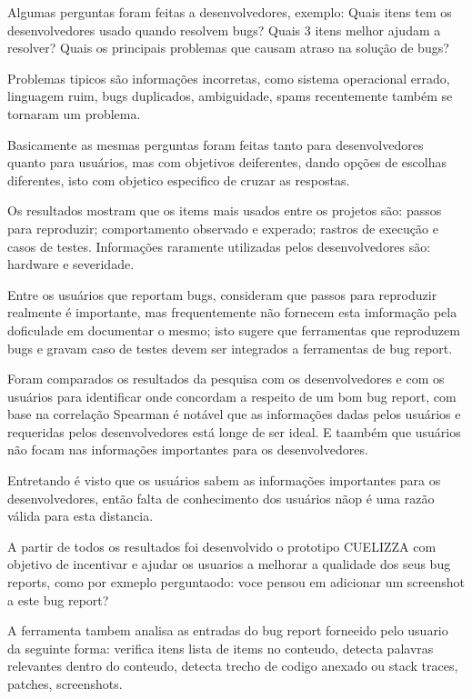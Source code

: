 \documentclass[12pt]{article}
\begin{document}
Algumas perguntas foram feitas a desenvolvedores, exemplo: Quais itens tem os desenvolvedores usado quando resolvem bugs? Quais 3 itens melhor ajudam a resolver? Quais os principais problemas que causam atraso na solução de bugs?

Problemas tipicos são informações incorretas, como sistema operacional errado, linguagem ruim, bugs duplicados, ambiguidade, spams recentemente também se tornaram um problema.

Basicamente as mesmas perguntas foram feitas tanto para desenvolvedores quanto para usuários, mas com objetivos deiferentes, dando opções de escolhas diferentes, isto com objetico especifico de cruzar as respostas.

Os resultados mostram que os items mais usados entre os projetos são: passos para reproduzir; comportamento observado e experado; rastros de execução e casos de testes. Informações raramente utilizadas pelos desenvolvedores são: hardware e severidade.

Entre os usuários que reportam bugs, consideram que passos para reproduzir realmente é importante, mas frequentemente não fornecem esta imformação pela doficulade em documentar o mesmo; isto sugere que ferramentas que reproduzem bugs e gravam caso de testes devem ser integrados a ferramentas de bug report.

Foram comparados os resultados da pesquisa com os desenvolvedores e com os usuários para identificar onde concordam a respeito de um bom bug report, com base na correlação Spearman é notável que as informações dadas pelos usuários e requeridas pelos desenvolvedores está longe de ser ideal. E taambém que usuários não focam nas informações importantes para os desenvolvedores.

Entretando é visto que os usuários sabem as informações importantes para os desenvolvedores, então falta de conhecimento dos usuários nãop é uma razão válida para esta distancia.

A partir de todos os resultados foi desenvolvido o prototipo CUELIZZA com objetivo de incentivar e ajudar os usuarios a melhorar a qualidade dos seus bug reports, como por exmeplo perguntaodo: voce pensou em adicionar um screenshot a este bug report?

A ferramenta tambem analisa as entradas do bug report forneeido pelo usuario da seguinte forma: verifica itens lista de items no conteudo, detecta palavras relevantes dentro do conteudo, detecta trecho de codigo anexado ou stack traces, patches, screenshots.
\end{document}
